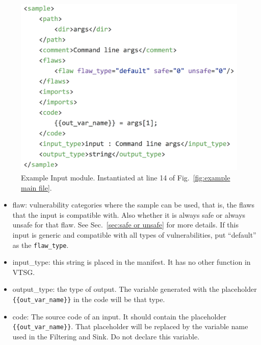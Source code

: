 \documentclass[12pt]{article}
\begin{document}
\begin{figure}[htb]
  \includegraphics{fig_Input_file.png}
  \caption{Example Input module.  Instantiated at line 14 of 
  Fig.~\ref{fig:example main file}.}
  \label{fig:example input file}
\end{figure}

\begin{itemize}
    \item flaw: vulnerability categories where the sample can be used, that is, the
      flaws that the input is compatible with.  Also whether it is always safe or
      always unsafe for that flaw.  See Sec.~\ref{sec:safe or unsafe}
      for more details.  If this input is generic and compatible with all
      types of vulnerabilities, put ``default'' as the \verb|flaw_type|.

    \item input\_type: this string is placed in the manifest.  It has no other
      function in VTSG.

    \item output\_type: the type of output.  The variable generated with the
      placeholder \\ \verb|{{out_var_name}}| in the code will be that type.

    \item code: The source code of an input. It should contain the placeholder \\
      \verb|{{out_var_name}}|.  That placeholder will be replaced by the variable
      name used in the Filtering and Sink.  Do not declare this variable.
\end{itemize}
\end{document}
